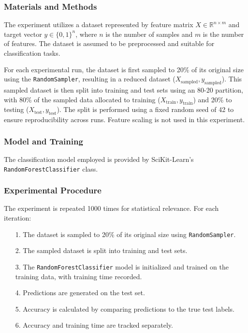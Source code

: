 \documentclass{article}
\theoremstyle{plain}
\theoremstyle{definition}
\theoremstyle{remark}
\begin{document}
\subsubsection{Materials and Methods}

The experiment utilizes a dataset represented by feature matrix $ X \in \mathbb{R}^{n \times m} $ and target vector $ y \in \{0, 1\}^n $, where $ n $ is the number of samples and $ m $ is the number of features. The dataset is assumed to be preprocessed and suitable for classification tasks.

For each experimental run, the dataset is first sampled to 20\% of its original size using the \texttt{RandomSampler}, resulting in a reduced dataset ($ X_{\text{sampled}}, y_{\text{sampled}} $). This sampled dataset is then split into training and test sets using an 80-20 partition, with 80\% of the sampled data allocated to training ($ X_{\text{train}}, y_{\text{train}} $) and 20\% to testing ($ X_{\text{test}}, y_{\text{test}} $). The split is performed using a fixed random seed of 42 to ensure reproducibility across runs. Feature scaling is not used in this experiment.

\subsubsection{Model and Training}

The classification model employed is provided by SciKit-Learn's \texttt{RandomForestClassifier} class.

\subsubsection{Experimental Procedure}

The experiment is repeated 1000 times for statistical relevance. For each iteration:

\begin{itemize}
	\item [1.] The dataset is sampled to 20\% of its original size using \texttt{RandomSampler}.
	\item [2.] The sampled dataset is split into training and test sets.
	\item [3.] The \texttt{RandomForestClassifier} model is initialized and trained on the training data, with training time recorded.
	\item [4.] Predictions are generated on the test set.
	\item [5.] Accuracy is calculated by comparing predictions to the true test labels.
	\item [6.] Accuracy and training time are tracked separately.
\end{itemize}
\end{document}
